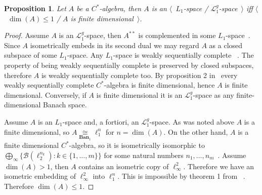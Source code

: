 \documentclass[12pt]{article}
\newtheorem{proposition}[theorem]{Proposition}
\newcommand{\isom}[1]{\mathop{\mathbin{\cong}}\limits_{#1}}
\begin{document}
\begin{proposition}\label{CStarAlgIsL1IfFinDim} Let $A$ be a $C^*$-algebra, then
$A$ is an $\langle$~$L_1$-space / $\mathcal{L}_1^g$-space~$\rangle$ iff
$\langle$~$\operatorname{dim}(A)\leq 1$ / $A$ is finite dimensional~$\rangle$.
\end{proposition}
\begin{proof} Assume $A$ is an $\mathcal{L}_1^g$-space, then $A^{**}$ is
complemented in some $L_1$-space~\cite[corollary 23.2.1(2)]{DefFloTensNorOpId}.
Since $A$ isometrically embeds in its second dual we may regard $A$ as a closed
subspace of some $L_1$-space. Any $L_1$-space is weakly sequentially complete
~\cite[corollary III.C.14]{WojBanSpForAnalysts}. The property of being weakly
sequentially complete is preserved by closed subspaces, therefore $A$ is weakly
sequentially complete too. By proposition 2 in~\cite{SakWeakCompOpOnOpAlg} every
weakly sequentially complete $C^*$-algebra is finite dimensional, hence $A$ is
finite dimensional. Conversely, if $A$ is finite dimensional it is an
$\mathcal{L}_1^g$-space as any finite-dimensional Banach space.

Assume $A$ is an $L_1$-space and, a fortiori, an $\mathcal{L}_1^g$-space. As was
noted above $A$ is a finite dimensional, so $A\isom{\mathbf{Ban}_1}\ell_1^n$ for
$n=\operatorname{dim}(A)$. On the other hand, $A$ is a finite dimensional
$C^*$-algebra, so it is isometrically isomorphic to $\bigoplus_\infty
\{\mathcal{B}(\ell_2^{n_k}):k\in \{1,\ldots,m \} \}$ for some natural numbers
$n_1,\ldots,n_m$~\cite[theorem III.1.1]{DavCSatrAlgByExmpl}. Assume
$\operatorname{dim}(A)>1$, then $A$ contains an isometric copy of
$\ell_\infty^2$. Therefore we have an isometric embedding of $\ell_\infty^2$
into $\ell_1^n$. This is impossible by theorem 1 from
~\cite{LyubIsomEmdbFinDimLp}. Therefore $\operatorname{dim}(A)\leq 1$.
\end{proof}
\end{document}
